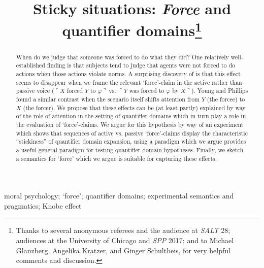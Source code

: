\documentclass{salt}
\title[Sticky situations]{Sticky situations: \emph{Force} and quantifier domains\thanks{Thanks to several anonymous referees and the audience at \emph{SALT} 28; audiences at the University of Chicago and \emph{SPP} 2017; and to Michael Glanzberg, Angelika Kratzer, and Ginger Schultheis, for very helpful comments and discussion.}}
\author[Matthew Mandelkern and Jonathan Phillips]{%
  \saltauthor{Matthew Mandelkern \\ \institute{All Souls College, Oxford}} \AND
  \saltauthor{Jonathan Phillips \\ \institute{Harvard University}}%
}
\newcommand{\ul}{$\ulcorner$}
\newcommand{\ur}{$\urcorner\ $}
\newcommand{\urn}{$\urcorner$}
\begin{document}

\maketitle

%
\setcounter{page}{1}


\begin{abstract}  
When do we judge that someone was forced to do what they did? One relatively well-established finding is that subjects tend to judge that agents were not forced to do actions when those actions violate norms. A surprising discovery of \citealt{young2011paradox} is that this effect seems to disappear when we frame the relevant `force'-claim in the active rather than passive voice (\ul $X$ forced $Y$ to $\varphi$\ur vs. \ul$Y$ was forced to $\varphi$ by $X$\urn). Young and Phillips found a similar contrast when the scenario itself shifts attention from $Y$ (the forcee) to $X$ (the forcer). We propose that these effects can be (at least partly) explained by way of the role of attention in the setting of quantifier domains which in turn play a role in the evaluation of `force'-claims. We argue for this hypothesis by way of an experiment which shows that sequences of active vs. passive `force'-claims display the characteristic ``stickiness'' of quantifier domain expansion, using a paradigm which we argue provides a useful general paradigm for testing quantifier domain hypotheses. Finally, we sketch a semantics for `force' which we argue is suitable for capturing these effects. 
\end{abstract}

\begin{keywords}
 moral psychology; `force'; quantifier domains; experimental semantics and pragmatics; Knobe effect
\end{keywords}
\end{document}
